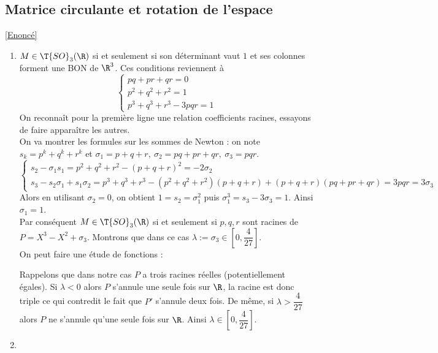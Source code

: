 \documentclass[8pt]{book}
\begin{document}
	\subsection{Matrice circulante et rotation de l'espace}
	\label{Matrice circulante et rotation de l'espace corrigé}
	\textcolor{blue}{\hyperref[Matrice circulante et rotation de l'espace]{[Enoncé]}}\\
	\begin{enumerate}[leftmargin=*]
		\item $M\in \T{SO}_3(\R)$ si et seulement si son déterminant vaut $1$ et ses colonnes forment une BON de $\R^3$. Ces conditions reviennent à
		$$\begin{cases}
			pq+pr+qr=0\\
			p^2+q^2+r^2=1\\
			p^3+q^3+r^3-3pqr=1
		\end{cases}$$
		On reconnaît pour la première ligne une relation coefficients racines, essayons de faire apparaître les autres.\\
		On va montrer les formules sur les sommes de Newton : on note $s_k=p^k+q^k+r^k$ et $\sigma_1=p+q+r,\ \sigma_2=pq+pr+qr,\ \sigma_3=pqr$.\\
		$$\begin{cases}
			s_2-\sigma_1s_1=p^2+q^2+r^2-(p+q+r)^2=-2\sigma_2\\
			s_3-s_2\sigma_1+s_1\sigma_2=p^3+q^3+r^3-(p^2+q^2+r^2)(p+q+r)+(p+q+r)(pq+pr+qr)=3pqr=3\sigma_3
		\end{cases}$$
		Alors en utilisant $\sigma_2=0$, on obtient $1=s_2=\sigma_1^2$ puis $\sigma_1^3=s_3-3\sigma_3=1$. Ainsi $\sigma_1=1$.\\
		Par conséquent $M\in \T{SO}_3(\R)$ si et seulement si $p,q,r$ sont racines de $P=X^3-X^2+\sigma_3$. Montrons que dans ce cas $\lambda:=\sigma_3\in \left[0,\dfrac{4}{27}\right]$.\\
		On peut faire une étude de fonctions :
		\begin{center}
		\end{center}
		Rappelons que dans notre cas $P$ a trois racines réelles (potentiellement égales).
		Si $\lambda<0$ alors $P$ s'annule une seule fois sur $\R$, la racine est donc triple ce qui contredit le fait que $P'$ s'annule deux fois. De même, si $\lambda>\dfrac{4}{27}$ alors $P$ ne s'annule qu'une seule fois sur $\R$. Ainsi $\lambda\in \left[0,\dfrac{4}{27}\right]$.
		\item 
	\end{enumerate}
	
\end{document}
